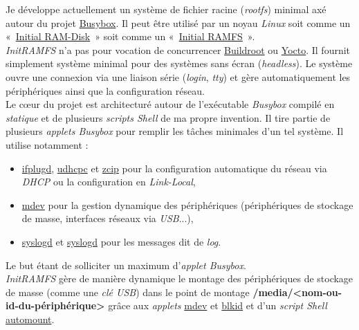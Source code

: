 \documentclass[a4paper]{article}
\begin{document}
Je développe actuellement un système de fichier racine (\textit{rootfs}) minimal axé autour du projet \href{http://www.busybox.net/}{Busybox}. Il peut être utilisé par un noyau \textit{Linux} soit comme un «~\href{https://www.kernel.org/doc/Documentation/initrd.txt}{Initial RAM-Disk}~» soit comme un «~\href{https://www.kernel.org/doc/Documentation/filesystems/ramfs-rootfs-initramfs.txt}{Initial RAMFS}~».\\

\textit{InitRAMFS} n'a pas pour vocation de concurrencer \href{http://buildroot.org/}{Buildroot} ou \href{https://www.yoctoproject.org/}{Yocto}. Il fournit simplement système minimal pour des systèmes sans écran (\textit{headless}). Le système ouvre une connexion via une liaison série (\textit{login}, \textit{tty}) et gère automatiquement les périphériques ainsi que la configuration réseau.\\

Le c\oe{}ur du projet est architecturé autour de l'exécutable \textit{Busybox} compilé en \textit{statique} et de plusieurs \textit{scripts Shell} de ma propre invention. Il tire partie de plusieurs \textit{applets Busybox} pour remplir les tâches minimales d'un tel système. Il utilise notamment :
\begin{itemize}
\item \href{http://www.busybox.net/downloads/BusyBox.html#ifplugd}{ifplugd}, \href{http://www.busybox.net/downloads/BusyBox.html#udhcpc}{udhcpc} et \href{http://www.busybox.net/downloads/BusyBox.html#zcip}{zcip} pour la configuration automatique du réseau via \textit{DHCP} ou la configuration en \textit{Link-Local},
\item \href{http://www.busybox.net/downloads/BusyBox.html#mdev}{mdev} pour la gestion dynamique des périphériques (périphériques de stockage de masse, interfaces réseaux via \textit{USB}...),
\item \href{http://www.busybox.net/downloads/BusyBox.html#syslogd}{syslogd} et \href{http://www.busybox.net/downloads/BusyBox.html#klogd}{syslogd} pour les messages dit de \textit{log}.
\end{itemize}

Le but étant de solliciter un maximum d'\textit{applet Busybox}.\\

\textit{InitRAMFS} gère de manière dynamique le montage des périphériques de stockage de masse (comme une \textit{clé USB}) dans le point de montage \textbf{/media/<nom-ou-id-du-périphérique>} grâce aux \textit{applets} \href{http://www.busybox.net/downloads/BusyBox.html#mdev}{mdev} et \href{http://www.busybox.net/downloads/BusyBox.html#blkid}{blkid} et d'un \textit{script Shell} \href{https://github.com/gportay/initramfs/blob/old-fixes-and-dev-need-study/packages-initramfs/mdev/usr/sbin/automount}{automount}.\\
\end{document}
